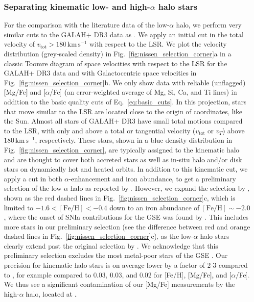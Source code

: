 \documentclass[fleqn,usenatbib]{mnras}
\newcommand{\kms}{\,\mathrm{km\,s^{-1}}}	%
\begin{document}
\subsubsection{Separating kinematic low- and high-\texorpdfstring{$\alpha$}{alpha} halo stars}

For the comparison with the literature data of the low-$\alpha$ halo, we perform very similar cuts to the GALAH+ DR3 data as \cite{Nissen2010}. We apply an initial cut in the total velocity of $v_\text{tot} > 180\kms$ with respect to the LSR. We plot the velocity distribution (grey-scaled density) in Fig.~\ref{fig:nissen_selection_corner}a in a classic Toomre diagram of space velocities with respect to the LSR for the GALAH+ DR3 data and with Galactocentric space velocities in Fig.~\ref{fig:nissen_selection_corner}b. We only show data with reliable (unflagged) [Mg/Fe] and [$\alpha$/Fe] (an error-weighted average of Mg, Si, Ca, and Ti lines) in addition to the basic quality cuts of Eq.~\ref{eq:basic_cuts}. In this projection, stars that move similar to the LSR are located close to the origin of coordinates, like the Sun. Almost all stars of GALAH+ DR3 have small total motions compared to the LSR, with only  and  above a total or tangential velocity ($v_\text{tot}$ or $v_T$) above $180\kms$, respectively. These stars, shown in a blue density distribution in Fig.~\ref{fig:nissen_selection_corner}, are typically assigned to the kinematic halo \citep[e.g.][]{Venn2004} and are thought to cover both accreted stars as well as in-situ halo and/or disk stars on dynamically hot and heated orbits.
In addition to this kinematic cut, we apply a cut in both $\alpha$-enhancement and iron abundance, to get a preliminary selection of the low-$\alpha$ halo as reported by \citet{Nissen2010}. However, we expand the selection by \citet{Nissen2010}, shown as the red dashed lines in Fig.~\ref{fig:nissen_selection_corner}c, which is limited to $-1.6 < \mathrm{[Fe/H]} < -0.4$ down to an iron abundance of $\mathrm{[Fe/H]} \sim -2.0$, where the onset of SNIa contributions for the GSE was found by \citet{Matsuno2019}. This includes more stars in our preliminary selection (see the difference between red and orange dashed lines in Fig.~\ref{fig:nissen_selection_corner}c), as the low-$\alpha$ halo stars clearly extend past the original selection by \citet{Nissen2010}. We acknowledge that this preliminary selection excludes the most metal-poor stars of the GSE \citep{Cordoni2021}. Our precision for kinematic halo stars is on average lower by a factor of 2-3 compared to \citet{Nissen2010}, for example \protect compared to 0.03, 0.03, and 0.02 for [Fe/H], [Mg/Fe], and [$\alpha$/Fe]. We thus see a significant contamination of our [Mg/Fe] measurements by the high-$\alpha$ halo, located at . 
\end{document}
